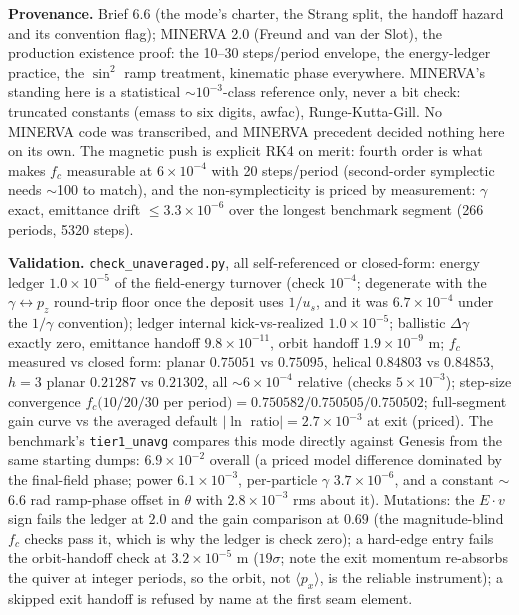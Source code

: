\documentclass[11pt]{article}
\newcommand{\code}[1]{\texttt{#1}}
\newenvironment{provenance}{\par\small\textbf{Provenance.}}{\par}
\newenvironment{validation}{\par\small\textbf{Validation.}}{\par}
\begin{document}
\begin{provenance}
Brief 6.6 (the mode's charter, the Strang split, the handoff hazard and its
convention flag); MINERVA 2.0 (Freund and van der Slot), the production
existence proof: the 10--30 steps/period envelope, the energy-ledger practice, the
$\sin^2$ ramp treatment, kinematic phase everywhere. MINERVA's standing here is a
statistical $\sim$$10^{-3}$-class reference only, never a bit check: truncated
constants (emass to six digits, awfac), Runge-Kutta-Gill. No MINERVA code was
transcribed, and MINERVA precedent decided nothing here on its own. The magnetic
push is explicit RK4 on merit: fourth order is what makes $f_c$ measurable at
$6\times10^{-4}$ with 20 steps/period (second-order symplectic needs $\sim$100 to
match), and the non-symplecticity is priced by measurement: $\gamma$ exact,
emittance drift $\le 3.3\times10^{-6}$ over the longest benchmark segment
(266 periods, 5320 steps).
\end{provenance}
\begin{validation}
\code{check\_unaveraged.py}, all self-referenced or closed-form: energy ledger
$1.0\times10^{-5}$ of the field-energy turnover (check $10^{-4}$; degenerate with the
$\gamma\leftrightarrow p_z$ round-trip floor once the deposit uses $1/u_s$, and it was
$6.7\times10^{-4}$ under the $1/\gamma$ convention); ledger internal
kick-vs-realized $1.0\times10^{-5}$; ballistic $\Delta\gamma$ exactly zero,
emittance handoff $9.8\times10^{-11}$, orbit handoff $1.9\times10^{-9}$ m;
$f_c$ measured vs closed form: planar $0.75051$ vs $0.75095$, helical $0.84803$ vs
$0.84853$, $h{=}3$ planar $0.21287$ vs $0.21302$, all $\sim$$6\times10^{-4}$
relative (checks $5\times10^{-3}$); step-size convergence $f_c(10/20/30$ per period$)
= 0.750582/0.750505/0.750502$; full-segment gain curve vs the averaged default
$|\ln$ ratio$| = 2.7\times10^{-3}$ at exit (priced). The benchmark's
\code{tier1\_unavg} compares this mode directly against Genesis from the same
starting dumps: $6.9\times10^{-2}$ overall (a priced model difference dominated by
the final-field phase; power $6.1\times10^{-3}$, per-particle $\gamma$
$3.7\times10^{-6}$, and a constant $\sim$6.6 rad ramp-phase offset in $\theta$ with
$2.8\times10^{-3}$ rms about it). Mutations: the
$E\cdot v$ sign fails the ledger at $2.0$ and the gain comparison at $0.69$ (the
magnitude-blind $f_c$ checks pass it, which is why the ledger is check zero); a hard-edge
entry fails the orbit-handoff check at $3.2\times10^{-5}$ m ($19\sigma$; note the
exit momentum re-absorbs the quiver at integer periods, so the orbit, not
$\langle p_x\rangle$, is the reliable instrument); a skipped exit handoff is refused
by name at the first seam element.
\end{validation}
\end{document}
